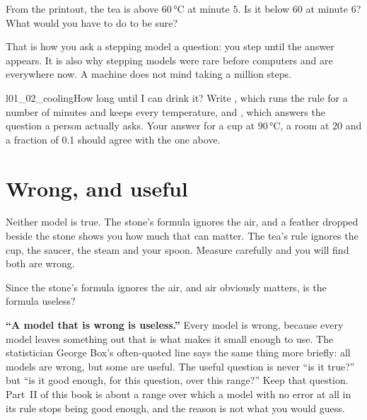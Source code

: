 \begin{think}
From the printout, the tea is above $60$\,°C at minute $5$. Is it below
$60$ at minute $6$? What would you have to do to be sure?
\end{think}
That is how you ask a stepping model a question: you step until the answer
appears. It is also why stepping models were rare before computers and are
everywhere now. A machine does not mind taking a million steps.


\begin{lab}{l01_02_cooling}{How long until I can drink it?}
Write , which runs the rule for a number of minutes and keeps every
temperature, and , which answers the question a person
actually asks. Your answer for a cup at $90$\,°C, a room at $20$ and a
fraction of \num{0.1} should agree with the one above.
\end{lab}

\section{Wrong, and useful}
\label{sec:ch01-wrong}

\noindent
Neither model is true. The stone's formula ignores the air, and a feather
dropped beside the stone shows you how much that can matter. The tea's rule
ignores the cup, the saucer, the steam and your spoon. Measure carefully and
you will find both are wrong.

\begin{think}
Since the stone's formula ignores the air, and air obviously matters, is the
formula useless?
\end{think}

\begin{trapbox}
\textbf{\enquote{A model that is wrong is useless.}} Every model is wrong,
because every model leaves something out \dash{} that is what makes it small
enough to use. The statistician George Box's often-quoted line says the same
thing more briefly: all models are wrong, but some are useful. The useful
question is never \enquote{is it true?} but \enquote{is it good enough, for
this question, over this range?} Keep that question. Part~II of this book is
about a range over which a model with no error at all in its rule stops being
good enough, and the reason is not what you would guess.
\end{trapbox}


